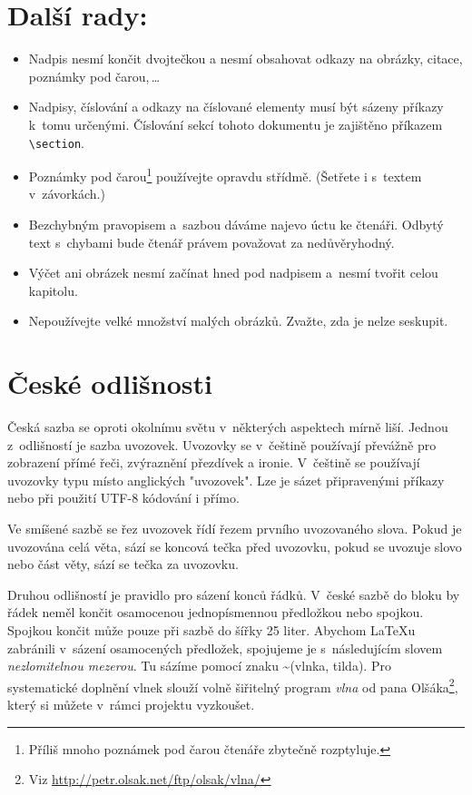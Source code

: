 \documentclass[a4paper, 10pt, twocolumn]{article}
\begin{document}
\section{Další rady:}\label{sec:rady}
\begin{itemize}
  \item Nadpis nesmí končit dvojtečkou a nesmí obsahovat odkazy na obrázky, citace, poznámky pod čarou,\,\dots
  \item Nadpisy, číslování a odkazy na číslované elementy musí být sázeny příkazy k~tomu   určenými.
  Číslování sekcí tohoto dokumentu je zajištěno příkazem \verb|\section|.
  \item Poznámky pod čarou\footnote{Příliš mnoho poznámek pod čarou čtenáře zbytečně rozptyluje.} používejte opravdu střídmě. (Šetřete i s~textem v~závorkách.)
  \item Bezchybným pravopisem a~sazbou dáváme najevo úctu ke čtenáři. Odbytý
  text s~chybami bude čtenář právem považovat za nedůvěryhodný.
  \item Výčet ani obrázek nesmí začínat hned pod nadpisem a~nesmí tvořit celou kapitolu.
  \item Nepoužívejte velké množství malých obrázků. Zvažte, zda je nelze seskupit.
\end{itemize}
\section{České odlišnosti}\label{sec:ceske}
Česká sazba se oproti okolnímu světu v~některých aspektech mírně liší.
Jednou z~odlišností je sazba uvozovek.
Uvozovky se v~češtině používají převážně pro zobrazení přímé řeči, zvýraznění přezdívek a ironie.
V~češtině se používají uvozovky typu  místo anglických "uvozovek".
Lze je sázet připravenými příkazy nebo při použití UTF-8 kódování i přímo.

Ve smíšené sazbě se řez uvozovek řídí řezem prvního uvozovaného slova.
Pokud je uvozována celá věta, sází se koncová tečka před uvozovku, pokud se uvozuje slovo nebo část věty, sází se tečka za uvozovku.

Druhou odlišností je pravidlo pro sázení konců řádků.
V~české sazbě do bloku by řádek neměl končit osamocenou jednopísmennou předložkou nebo spojkou.
Spojkou  končit může pouze při sazbě do šířky 25 liter.
Abychom \LaTeX u zabránili v~sázení osamocených předložek, spojujeme je s~následujícím slovem \emph{nezlomitelnou mezerou}.
Tu sázíme pomocí znaku \textasciitilde (vlnka, tilda).
Pro systematické doplnění vlnek slouží volně šiřitelný program \emph{vlna} od pana Olšáka\footnote{Viz \url{http://petr.olsak.net/ftp/olsak/vlna/}}, který si můžete v~rámci projektu vyzkoušet.
\end{document}
